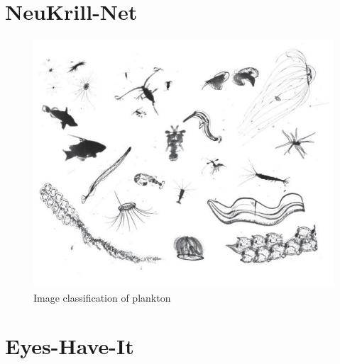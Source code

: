 \documentclass[ignorenonframetext,]{beamer}
\begin{document}
\section{NeuKrill-Net}\label{neukrill-net}

\begin{frame}

\begin{figure}[htbp]
\centering
\includegraphics{assets/presentation/NDSB/raw_data.png}
\caption{Image classification of plankton}
\end{figure}

\end{frame}

\section{Eyes-Have-It}\label{eyes-have-it}
\end{document}
